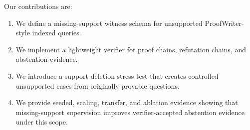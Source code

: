 Our contributions are:
\begin{enumerate}
\item We define a missing-support witness schema for unsupported ProofWriter-style indexed queries.
\item We implement a lightweight verifier for proof chains, refutation chains, and abstention evidence.
\item We introduce a support-deletion stress test that creates controlled unsupported cases from originally provable questions.
\item We provide seeded, scaling, transfer, and ablation evidence showing that missing-support supervision improves verifier-accepted abstention evidence under this scope.
\end{enumerate}
